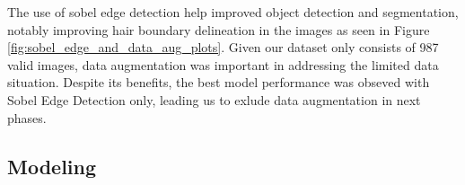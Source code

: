The use of sobel edge detection help improved object detection and segmentation, notably improving hair boundary delineation in the images as seen in Figure \ref{fig:sobel_edge_and_data_aug_plots}. Given our dataset only consists of 987 valid images, data augmentation was important in addressing the limited data situation. Despite its benefits, the best model performance was obseved with Sobel Edge Detection only, leading us to exlude data augmentation in next phases.

\subsection{Modeling}








